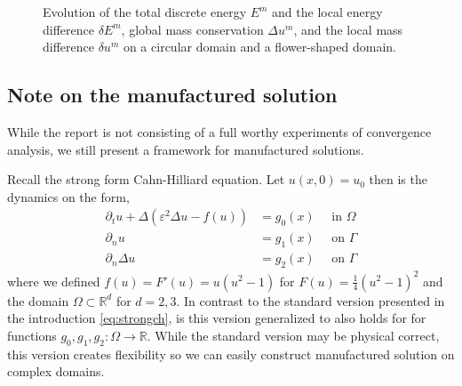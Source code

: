 \begin{figure}[h!]

\caption{Evolution of the total discrete energy $E^m$ and the local energy difference $\delta E^m$, global mass conservation $\Delta u^m$, and the local mass difference $\delta u^m$ on a circular domain and a flower-shaped domain. }
\label{fig:physical_CH_plot}
\end{figure}


\subsection{Note on the manufactured solution}%
\label{sub:the_problem}

While the report is not consisting of a full worthy experiments of convergence analysis, we still present a framework for manufactured solutions.

Recall the strong form Cahn-Hilliard equation. Let $ u( x,0) =  u_{0}$ then is the dynamics on the form,
\begin{subequations}
    \label{eq:ch_gen}
    \begin{align}
    \label{eq:ch_gen:a}
        \partial _{t} u + \Delta  \left(  \varepsilon^2  \Delta u - f( u) \right)   &= g_{0}( x)   \quad \text{ in } \Omega  \\
        \partial _{n} u &= g_{1}( x)  \quad \text{ on } \Gamma  \\
        \partial _{n}    \Delta u   &= g_{2}(x)  \quad \text{ on } \Gamma
    \end{align}
\end{subequations}
where we defined $f( u) = F'( u) =u( u^2 -1)  $ for $F( u) = \frac{1}{4}( u^{2} - 1)^{2} $ and the domain $\Omega \subset \mathbb{R} ^{d} $  for $d = 2,3$. In contrast to the standard version presented in the introduction \eqref{eq:strongch}, is this version
generalized to also holds for for functions $g_{0},g_{1},g_{2}: \Omega \to\mathbb{R}   $. While the standard version may be physical correct, this version creates flexibility so we can easily construct manufactured solution on complex domains.

